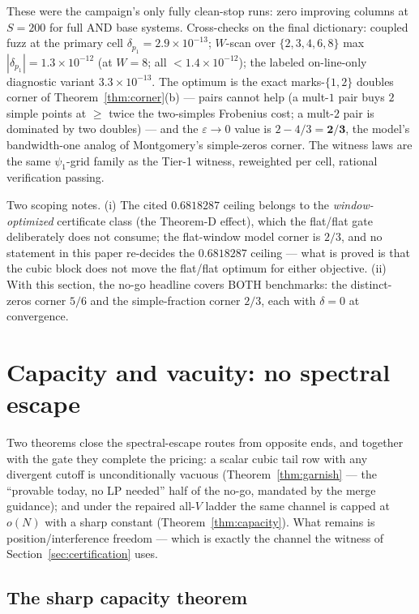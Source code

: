 \documentclass[11pt]{article}
\theoremstyle{plain}
\theoremstyle{definition}
\theoremstyle{remark}
\begin{document}
These were the campaign's only fully clean-stop runs: zero improving columns at
$S = 200$ for full AND base systems. Cross-checks on the final dictionary:
coupled fuzz at the primary cell $\delta_{p_1} = 2.9 \times 10^{-13}$; $W$-scan
over $\{2, 3, 4, 6, 8\}$ max $|\delta_{p_1}| = 1.3 \times 10^{-12}$ (at $W = 8$;
all $< 1.4 \times 10^{-12}$); the labeled on-line-only diagnostic variant
$3.3 \times 10^{-13}$. The optimum is the exact marks-$\{1,2\}$ doubles corner of
Theorem~\ref{thm:corner}(b) --- pairs cannot help (a mult-$1$ pair buys $2$
simple points at $\ge$ twice the two-simples Frobenius cost; a mult-$2$ pair is
dominated by two doubles) --- and the $\varepsilon \to 0$ value is
$2 - 4/3 = \mathbf{2/3}$, the model's bandwidth-one analog of Montgomery's
simple-zeros corner. The witness laws are the same $\psi_1$-grid family as the
Tier-1 witness, reweighted per cell, rational verification passing.

Two scoping notes. (i) The cited \textbf{$0.6818287$} ceiling belongs to the
\emph{window-optimized} certificate class (the Theorem-D effect), which the
flat/flat gate deliberately does not consume; the flat-window model corner is
$2/3$, and no statement in this paper re-decides the $0.6818287$ ceiling --- what
is proved is that the cubic block does not move the flat/flat optimum for either
objective. (ii) With this section, the no-go headline covers BOTH benchmarks: the
distinct-zeros corner $5/6$ and the simple-fraction corner $2/3$, each with
$\delta = 0$ at convergence.

\section{Capacity and vacuity: no spectral escape}
\label{sec:capacity}

Two theorems close the spectral-escape routes from opposite ends, and together
with the gate they complete the pricing: a scalar cubic tail row with any
divergent cutoff is unconditionally vacuous (Theorem~\ref{thm:garnish} --- the
``provable today, no LP needed'' half of the no-go, mandated by the merge
guidance); and under the repaired all-$V$ ladder the same channel is capped at
$o(N)$ with a sharp constant (Theorem~\ref{thm:capacity}). What remains is
position/interference freedom --- which is exactly the channel the witness of
Section~\ref{sec:certification} uses.

\subsection{The sharp capacity theorem}
\label{sec:sharpcap}
\end{document}
